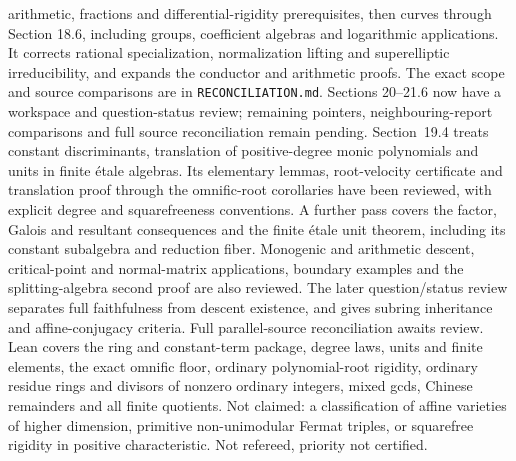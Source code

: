 \documentclass[11pt]{article}
\begin{document}
{arithmetic, fractions and differential-rigidity prerequisites, then curves
through Section 18.6, including groups, coefficient algebras and logarithmic
applications. It corrects
rational specialization, normalization
lifting and superelliptic irreducibility, and expands the conductor and
arithmetic proofs. The exact
scope and source comparisons are in \texttt{RECONCILIATION.md}. Sections
20--21.6 now have a workspace and question-status review; remaining pointers,
neighbouring-report comparisons and full source reconciliation remain pending.
Section~19.4 treats constant discriminants, translation of positive-degree
monic polynomials and units in finite étale algebras. Its elementary lemmas,
root-velocity certificate and translation proof through the omnific-root
corollaries have been reviewed, with explicit degree and squarefreeness
conventions. A further pass covers the factor, Galois and resultant consequences
and the finite étale unit theorem, including its constant subalgebra and
reduction fiber. Monogenic and arithmetic descent, critical-point and normal-matrix
applications, boundary examples and the splitting-algebra second proof are also
reviewed. The later question/status review separates full faithfulness from descent
existence, and gives subring inheritance and affine-conjugacy criteria.
Full parallel-source reconciliation awaits review.
Lean covers the ring and constant-term
package, degree laws, units and finite elements, the exact omnific floor,
ordinary polynomial-root rigidity, ordinary residue rings and divisors
of nonzero ordinary integers, mixed gcds, Chinese remainders and all
finite quotients. Not claimed: a classification of
affine varieties of higher dimension, primitive non-unimodular
Fermat triples, or squarefree rigidity
in positive characteristic. Not refereed, priority not certified.}
\end{document}
